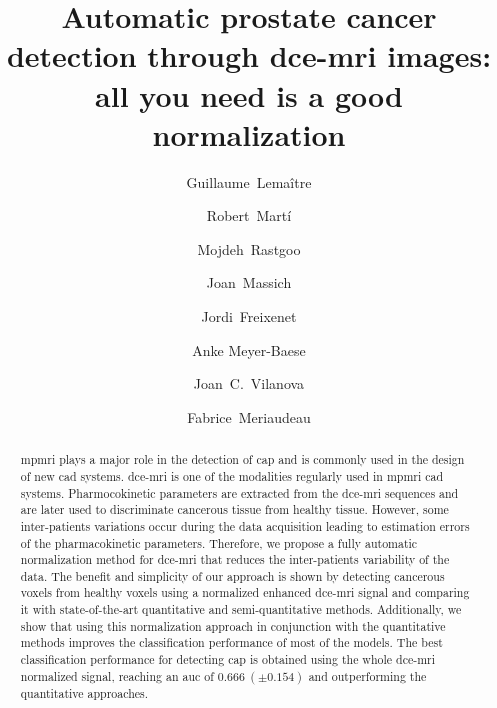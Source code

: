 \documentclass[review]{elsarticle}
\begin{document}
\begin{frontmatter}

\title{Automatic prostate cancer detection through \acs*{dce}-\acs*{mri} images: all you need is a good normalization}

\author[label1,label3]{Guillaume~Lema\^itre}
\author[label3]{Robert~Mart\'i}
\author[label1]{Mojdeh~Rastgoo}
\author[label1]{Joan~Massich}
\author[label3]{Jordi~Freixenet}
\author[label5]{Anke Meyer-Baese}
\author[label4]{Joan~C.~Vilanova}
\author[label1,label6]{Fabrice~Meriaudeau}
\address[label1]{\scriptsize LE2I UMR6306, CNRS, Arts et M\'etiers, Univ. Bourgogne Franche-Comt\'e, 12 rue de la Fonderie, 71200 Le Creusot, France}
\address[label3]{\scriptsize ViCOROB, Universitat de Girona, Campus Montilivi, Edifici P4, 17071 Girona, Spain}
\address[label4]{\scriptsize Department of Magnetic Resonance, Cl\'inica Girona, Lorenzana 36, 17002 Girona, Spain}
\address[label5]{\scriptsize Department of Scientific Computing, 400 Dirac Science Library, Florida State University, Tallahassee, FL 32306, United States}
\address[label6]{\scriptsize CISIR, Electrical \& Electronic Engineering Department, Universiti Teknologi Petronas, 32610 Seri Iskandar, Perak, Malaysia}

\begin{abstract}
\Ac{mpmri} plays a major role in the detection of \ac{cap} and is commonly used in the design of new \ac{cad} systems.
\ac{dce}-\ac{mri} is one of the modalities regularly used in \ac{mpmri} \ac{cad} systems.
Pharmocokinetic parameters are extracted from the \ac{dce}-\ac{mri}
sequences and are later used to discriminate cancerous tissue from healthy tissue.
However, some inter-patients variations occur during the data acquisition leading to estimation errors of the pharmacokinetic parameters.
Therefore, we propose a fully automatic normalization method for \ac{dce}-\ac{mri} that reduces the inter-patients variability of the data.
The benefit and simplicity of our approach is shown by detecting
cancerous voxels from healthy voxels using a normalized enhanced
\ac{dce}-\ac{mri} signal and comparing it with state-of-the-art quantitative and semi-quantitative methods.
Additionally, we show that using this normalization approach in conjunction with the quantitative methods improves the classification performance of most of the models.
The best classification performance for detecting \ac{cap} is obtained using the whole \ac{dce}-\ac{mri} normalized signal, reaching an \ac{auc} of $0.666\ (\pm 0.154)$ and outperforming the quantitative approaches.
\end{abstract}


\end{frontmatter}
\end{document}
